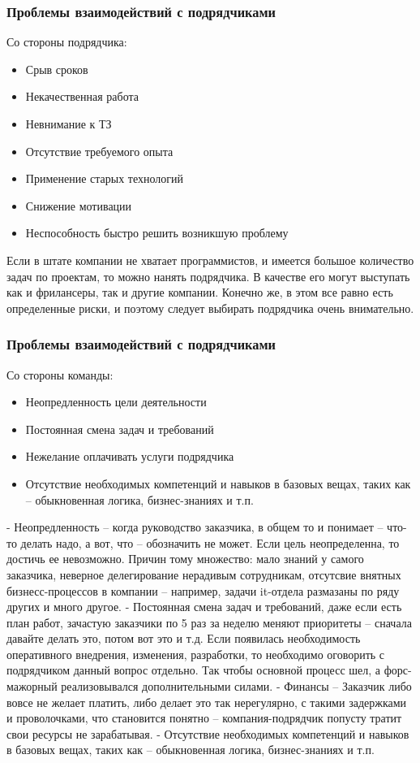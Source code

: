\documentclass{../industrial-development}
\begin{document}
\begin{frame} \frametitle{Проблемы взаимодействий с подрядчиками}
	Со стороны подрядчика:
	\begin{itemize}
		\item Срыв сроков 
		\item Некачественная работа
		\item Невнимание к ТЗ
		\item Отсутствие требуемого опыта
		\item Применение старых технологий
		\item Снижение мотивации
		\item Неспособность быстро решить возникшую проблему
  	\end{itemize}
\end{frame}

\lecturenotes
Если в штате компании не хватает программистов, и имеется большое количество задач по проектам, то можно нанять подрядчика. В качестве его могут выступать как и фрилансеры, так и другие компании. Конечно же, в этом все равно есть определенные риски, и поэтому следует выбирать подрядчика очень внимательно. 

\begin{frame} \frametitle{Проблемы взаимодействий с подрядчиками}
	Со стороны команды:
	\begin{itemize}
		\item Неопредленность цели деятельности
		\item Постоянная смена задач и требований
		\item Нежелание оплачивать услуги подрядчика
		\item Отсутствие необходимых компетенций и навыков  в базовых вещах, таких как – обыкновенная логика, бизнес-знаниях и т.п.
	\end{itemize}
\end{frame}

\lecturenotes
- Неопредленность – когда руководство заказчика, в общем то и понимает – что-то делать надо, а вот, что – обозначить не может. Если цель неопределенна, то достичь ее невозможно. Причин тому множество: мало знаний у самого заказчика, неверное делегирование нерадивым сотрудникам, отсутсвие внятных бизнесс-процессов в компании – например, задачи it-отдела размазаны по ряду других и много другое.
- Постоянная смена задач и требований, даже если есть план работ, зачастую заказчики по 5 раз за неделю меняют приоритеты – сначала давайте делать это, потом вот это и т.д. Если появилась необходимость оперативного внедрения, изменения, разработки, то необходимо оговорить с подрядчиком данный вопрос отдельно. Так чтобы основной процесс шел, а форс-мажорный реализовывался дополнительными силами.
- Финансы – Заказчик либо вовсе не желает платить, либо делает это так нерегулярно, с такими задержками и проволочками, что становится понятно – компания-подрядчик попусту тратит свои ресурсы не зарабатывая.
- Отсутствие необходимых компетенций и навыков в базовых вещах, таких как – обыкновенная логика, бизнес-знаниях и т.п. 

\begin{thebibliography}{99}
\end{thebibliography}
\end{document}
